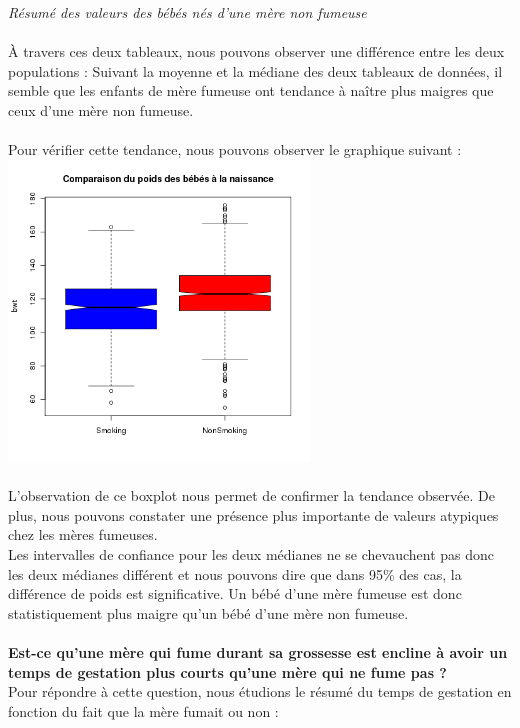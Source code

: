 \documentclass[a4paper, 10pt]{article}
\begin{document}
\textit{R\'esum\'e des valeurs des b\'eb\'es n\'es d'une m\`ere non fumeuse}\\ \\
\`A travers ces deux tableaux, nous pouvons observer une diff\'erence entre les deux populations :
Suivant la moyenne et la m\'ediane des deux tableaux de donn\'ees, il semble que les enfants de mère fumeuse
ont tendance \`a na\^itre plus maigres que ceux d'une m\`ere non fumeuse.\\ \\
Pour v\'erifier cette tendance, nous pouvons observer le graphique suivant :\\
\includegraphics[height = 8cm, width = 8cm]{plots/boxplot_bwt_smoke.png}\\ \\
L'observation de ce boxplot nous permet de confirmer la tendance observ\'ee.
De plus, nous pouvons constater une pr\'esence plus importante de valeurs atypiques chez les m\`eres fumeuses.\\
Les intervalles de confiance pour les deux m\'edianes ne se chevauchent pas donc les deux m\'edianes diff\'erent et nous pouvons
dire que dans 95\% des cas, la différence de poids est significative.
Un b\'eb\'e d'une m\`ere fumeuse est donc statistiquement plus maigre qu'un b\'eb\'e d'une m\`ere non fumeuse.\\ \\
\textbf{Est-ce qu'une m\`ere qui fume durant sa grossesse est encline \`a avoir un temps de gestation plus courts qu'une
m\`ere qui ne fume pas ?}\\
Pour répondre à cette question, nous étudions le résumé du temps de gestation en fonction du fait
que la m\`ere fumait ou non :\\ \\
\end{document}
